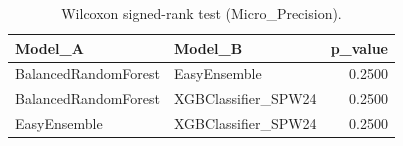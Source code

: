 \begin{table}[t]
\centering
\begin{tabular}{llr}
\toprule
Model_A & Model_B & p_value \\
\midrule
BalancedRandomForest & EasyEnsemble & 0.2500 \\
BalancedRandomForest & XGBClassifier_SPW24 & 0.2500 \\
EasyEnsemble & XGBClassifier_SPW24 & 0.2500 \\
\bottomrule
\end{tabular}
\caption{Wilcoxon signed-rank test (Micro_Precision).}
\label{tab:wilcoxon_Micro_Precision}
\end{table}